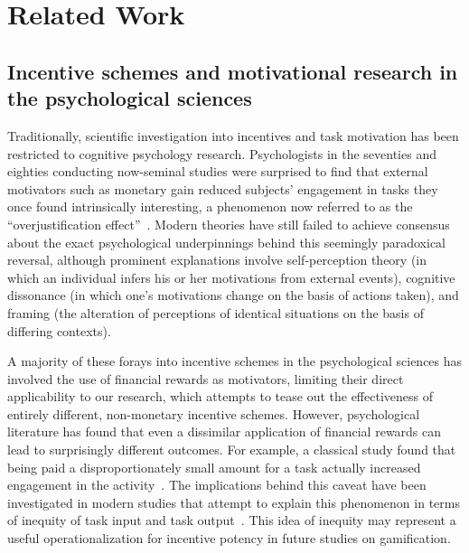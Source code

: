 \section{Related Work}

\subsection{Incentive schemes and motivational research in the psychological sciences}
Traditionally, scientific investigation into incentives and task motivation has been restricted to cognitive psychology research. Psychologists in the seventies and eighties conducting now-seminal studies were surprised to find that external motivators such as monetary gain reduced subjects’ engagement in tasks they once found intrinsically interesting, a phenomenon now referred to as the “overjustification effect”~\cite{lepper1973undermining}. Modern theories have still failed to achieve consensus about the exact psychological underpinnings behind this seemingly paradoxical reversal, although prominent explanations involve self-perception theory (in which an individual infers his or her motivations from external events), cognitive dissonance (in which one’s motivations change on the basis of actions taken), and framing (the alteration of perceptions of identical situations on the basis of differing contexts).

A majority of these forays into incentive schemes in the psychological sciences has involved the use of financial rewards as motivators, limiting their direct applicability to our research, which attempts to tease out the effectiveness of entirely different, non-monetary incentive schemes. However, psychological literature has found that even a dissimilar application of financial rewards can lead to surprisingly different outcomes. For example, a classical study found that being paid a disproportionately small amount for a task actually increased engagement in the activity~\cite{rosenfield1980rewards}. The implications behind this caveat have been investigated in modern studies that attempt to explain this phenomenon in terms of inequity of task input and task output~\cite{Ryan00}. This idea of inequity may represent a useful operationalization for incentive potency in future studies on gamification.

